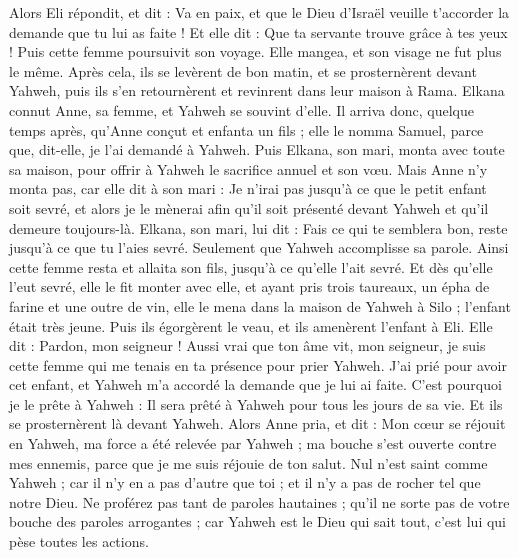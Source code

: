 \begin{multicols}{2}
Alors Eli répondit, et dit : Va en paix, et que le Dieu d'Israël veuille t’accorder la demande que tu lui as faite !
Et elle dit : Que ta servante trouve grâce à tes yeux ! Puis cette femme poursuivit son voyage. Elle mangea, et son visage ne fut plus le même.
Après cela, ils se levèrent de bon matin, et se prosternèrent devant Yahweh, puis ils s'en retournèrent et revinrent dans leur maison à Rama. Elkana connut Anne, sa femme, et Yahweh se souvint d'elle.
Il arriva donc, quelque temps après, qu'Anne conçut et enfanta un fils ; elle le nomma Samuel, parce que, dit-elle, je l'ai demandé à Yahweh.
Puis Elkana, son mari, monta avec toute sa maison, pour offrir à Yahweh le sacrifice annuel et son vœu.
Mais Anne n'y monta pas, car elle dit à son mari : Je n’irai pas jusqu'à ce que le petit enfant soit sevré, et alors je le mènerai afin qu'il soit présenté devant Yahweh et qu'il demeure toujours-là.
Elkana, son mari, lui dit : Fais ce qui te semblera bon, reste jusqu'à ce que tu l'aies sevré. Seulement que Yahweh accomplisse sa parole. Ainsi cette femme resta et allaita son fils, jusqu'à ce qu'elle l’ait sevré.
Et dès qu'elle l'eut sevré, elle le fit monter avec elle, et ayant pris trois taureaux, un épha de farine et une outre de vin, elle le mena dans la maison de Yahweh à Silo ; l'enfant était très jeune.
Puis ils égorgèrent le veau, et ils amenèrent l'enfant à Eli.
Elle dit : Pardon, mon seigneur ! Aussi vrai que ton âme vit, mon seigneur, je suis cette femme qui me tenais en ta présence pour prier Yahweh.
J'ai prié pour avoir cet enfant, et Yahweh m’a accordé la demande que je lui ai faite.
C'est pourquoi je le prête à Yahweh : Il sera prêté à Yahweh pour tous les jours de sa vie. Et ils se prosternèrent là devant Yahweh.
\VerseOne{}Alors Anne pria, et dit : Mon cœur se réjouit en Yahweh, ma force a été relevée par Yahweh ; ma bouche s'est ouverte contre mes ennemis, parce que je me suis réjouie de ton salut.
Nul n’est saint comme Yahweh ; car il n'y en a pas d'autre que toi ; et il n'y a pas de rocher tel que notre Dieu.
Ne proférez pas tant de paroles hautaines ; qu'il ne sorte pas de votre bouche des paroles arrogantes ; car Yahweh est le Dieu qui sait tout, c'est lui qui pèse toutes les actions.

\end{multicols}
